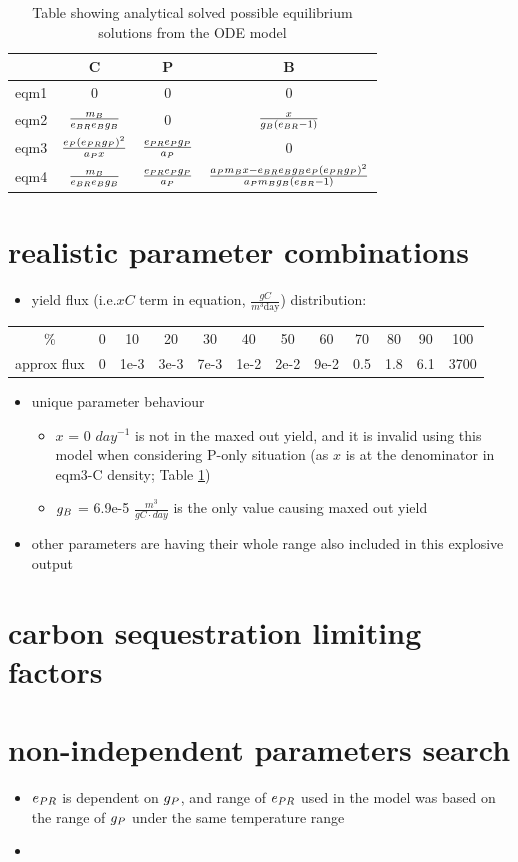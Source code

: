 \documentclass[../thesis.tex]{subfiles} %
\begin{document}
\begin{table}[H]
    \centering
    \caption{Table showing analytical solved possible equilibrium solutions from the ODE model}
    \begin{tabular}{c|ccc}\hline
        & C & P & B\\\hline
        eqm1 & 0 & 0 & 0\\
        eqm2 & $\frac{m_B}{e_{BR}e_Bg_B}$ & 0 & $\frac{x}{g_B(e_{BR}-1)}$\\
        eqm3 & $\frac{e_P(e_{PR}g_P)^2}{a_P x}$ & $\frac{e_{PR}e_Pg_P}{a_P}$ & 0\\
        eqm4 & $\frac{m_B}{e_{BR}e_Bg_B}$ & $\frac{e_{PR}e_Pg_P}{a_P}$ & $\frac{a_Pm_B x-e_{BR}e_Bg_Be_P(e_{PR}g_P)^2}{a_Pm_Bg_B(e_{BR}-1)}$\\\hline
    \end{tabular}
    \label{tab:anaSol}
\end{table}

\section{realistic parameter combinations}
\begin{itemize}
    \item yield flux (i.e.$xC$ term in equation, $\frac{gC}{m^3\text{day}}$) distribution:
\end{itemize}
\begin{center}
    \begin{tabular}{c|ccccccccccc}\hline
        \% & 0 & 10 & 20 & 30 & 40 & 50 & 60 & 70 & 80 & 90 & 100\\
        approx flux & 0 & 1e-3 & 3e-3 & 7e-3 & 1e-2 & 2e-2 & 9e-2 & 0.5 & 1.8 & 6.1 & 3700\\\hline
    \end{tabular}
\end{center}
\begin{itemize}
    \item unique parameter behaviour
    \begin{itemize}
        \item $x$ = 0 $day^{-1}$ is not in the maxed out yield, and it is invalid using this model when considering P-only situation (as $x$ is at the denominator in eqm3-C density; Table \ref{tab:anaSol})
        \item $g_B$ = 6.9e-5 $\frac{m^3}{gC\cdot day}$ is the only value causing maxed out yield
    \end{itemize}
    \item other parameters are having their whole range also included in this explosive output
\end{itemize}

\section{carbon sequestration limiting factors}

\section{non-independent parameters search}
\begin{itemize}
    \item $e_{PR}$ is dependent on $g_P$, and range of $e_{PR}$ used in the model was based on the range of $g_P$ under the same temperature range
    \item 
\end{itemize}
\end{document}
